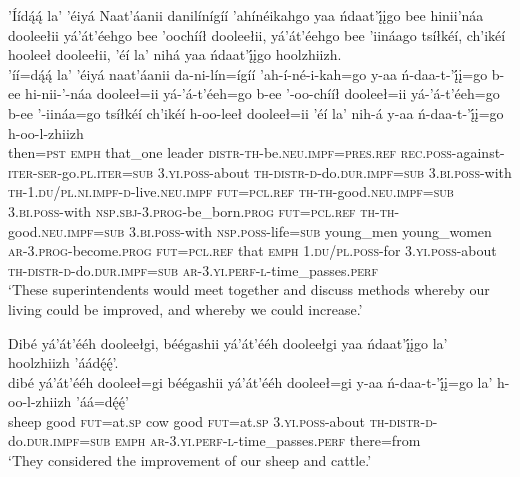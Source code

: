 \ea\label{ex:text7-4-3}
’Íídą́ą́ la’ ’éiyá Naat’áanii danilínígíí ’ahínéikahgo yaa ńdaat’į́įgo bee hinii’náa dooleełii yá’át’éehgo bee ’oochííł dooleełii, yá’át’éehgo bee ’iináago tsíłkéí, ch’ikéí hooleeł dooleełii, ’éí la’ nihá yaa ńdaat’į́įgo hoolzhiizh.\\
\gll ’íí=dą́ą́	la’	’éiyá	naat’áanii	da-ni-lín=ígíí	’ah-í-né-i-kah=go	y-aa	ń-daa-t-’į́į=go	b-ee	hi-nii-’-náa	dooleeł=ii	yá-’á-t’éeh=go	b-ee	’-oo-chííł	dooleeł=ii	yá-’á-t’éeh=go	b-ee	’-iináa=go	tsíłkéí	ch’ikéí	h-oo-leeł	dooleeł=ii	’éí	la’	nih-á	y-aa	ń-daa-t-’į́į=go	h-oo-l-zhiizh\\
     then=\textsc{pst}	\textsc{emph}	that\_one	leader	\textsc{distr}-\textsc{th}-be.\textsc{neu}.\textsc{impf}=\textsc{pres}.\textsc{ref}	\textsc{rec}.\textsc{poss}-against-\textsc{iter}-\textsc{ser}-go.\textsc{pl}.\textsc{iter}=\textsc{sub}	3.\textsc{yi}.\textsc{poss}-about	\textsc{th}-\textsc{distr}-\textsc{d}-do.\textsc{dur}.\textsc{impf}=\textsc{sub}	3.\textsc{bi}.\textsc{poss}-with	\textsc{th}-1.\textsc{du}/\textsc{pl}.\textsc{ni}.\textsc{impf}-\textsc{d}-live.\textsc{neu}.\textsc{impf}	\textsc{fut}=\textsc{pcl}.\textsc{ref}	\textsc{th}-\textsc{th}-good.\textsc{neu}.\textsc{impf}=\textsc{sub}	3.\textsc{bi}.\textsc{poss}-with	\textsc{nsp}.\textsc{sbj}-3.\textsc{prog}-be\_born.\textsc{prog}	\textsc{fut}=\textsc{pcl}.\textsc{ref}	\textsc{th}-\textsc{th}-good.\textsc{neu}.\textsc{impf}=\textsc{sub}	3.\textsc{bi}.\textsc{poss}-with	\textsc{nsp}.\textsc{poss}-life=\textsc{sub}	young\_men	young\_women	\textsc{ar}-3.\textsc{prog}-become.\textsc{prog}	\textsc{fut}=\textsc{pcl}.\textsc{ref}	that	\textsc{emph}	1.\textsc{du}/\textsc{pl}.\textsc{poss}-for	3.\textsc{yi}.\textsc{poss}-about	\textsc{th}-\textsc{distr}-\textsc{d}-do.\textsc{dur}.\textsc{impf}=\textsc{sub}	\textsc{ar}-3.\textsc{yi}.\textsc{perf}-\textsc{l}-time\_passes.\textsc{perf}\\
\glt `These superintendents would meet together and discuss methods whereby our living could be improved, and whereby we could increase.'
\z

\ea\label{ex:text7-4-4}
Dibé yá’át’ééh dooleełgi, béégashii yá’át’ééh dooleełgi yaa ńdaat’į́įgo la’ hoolzhiizh ’áádę́ę́’.\\
\gll dibé	yá’át’ééh	dooleeł=gi	béégashii	yá’át’ééh	dooleeł=gi	y-aa	ń-daa-t-’į́į=go	la’	h-oo-l-zhiizh	’áá=dę́ę́’\\
     sheep	good	\textsc{fut}=at.\textsc{sp}	cow	good	\textsc{fut}=at.\textsc{sp}	3.\textsc{yi}.\textsc{poss}-about	\textsc{th}-\textsc{distr}-\textsc{d}-do.\textsc{dur}.\textsc{impf}=\textsc{sub}	\textsc{emph}	\textsc{ar}-3.\textsc{yi}.\textsc{perf}-\textsc{l}-time\_passes.\textsc{perf}	there=from\\
\glt `They considered the improvement of our sheep and cattle.'
\z

